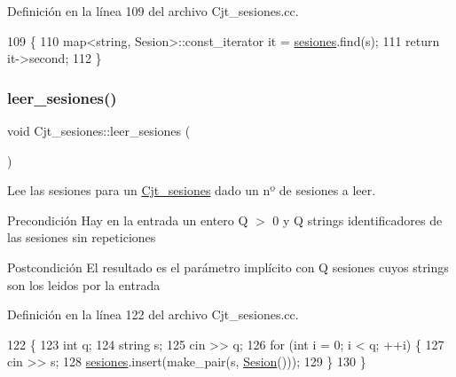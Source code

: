 Definición en la línea 109 del archivo Cjt\+\_\+sesiones.\+cc.


\begin{DoxyCode}
109                                                \{
110       map<string, Sesion>::const\_iterator it = \mbox{\hyperlink{class_cjt__sesiones_a87e835a62e561eeb0f93eedbdcbe1802}{sesiones}}.find(s);
111       \textcolor{keywordflow}{return} it->second;
112     \}
\end{DoxyCode}
\mbox{\label{class_cjt__sesiones_ac550e55acf1c249058d274214ba8f655}} 
\subsubsection{\texorpdfstring{leer\+\_\+sesiones()}{leer\_sesiones()}}
{\footnotesize\ttfamily void Cjt\+\_\+sesiones\+::leer\+\_\+sesiones (\begin{DoxyParamCaption}{ }\end{DoxyParamCaption})}



Lee las sesiones para un \mbox{\hyperlink{class_cjt__sesiones}{Cjt\+\_\+sesiones}} dado un nº de sesiones a leer. 

\begin{DoxyPrecond}{Precondición}
Hay en la entrada un entero Q $>$ 0 y Q strings identificadores de las sesiones sin repeticiones 
\end{DoxyPrecond}
\begin{DoxyPostcond}{Postcondición}
El resultado es el parámetro implícito con Q sesiones cuyos strings son los leidos por la entrada 
\end{DoxyPostcond}


Definición en la línea 122 del archivo Cjt\+\_\+sesiones.\+cc.


\begin{DoxyCode}
122                                      \{
123       \textcolor{keywordtype}{int} q;
124       \textcolor{keywordtype}{string} s;
125       cin >> q;
126       \textcolor{keywordflow}{for} (\textcolor{keywordtype}{int} i = 0; i < q; ++i) \{
127         cin >> s;
128         \mbox{\hyperlink{class_cjt__sesiones_a87e835a62e561eeb0f93eedbdcbe1802}{sesiones}}.insert(make\_pair(s, \mbox{\hyperlink{class_sesion}{Sesion}}()));
129       \}
130     \}
\end{DoxyCode}
\mbox{\label{class_cjt__sesiones_ab3d1427eaac58e65fa341d60f9e2a3b3}} 
